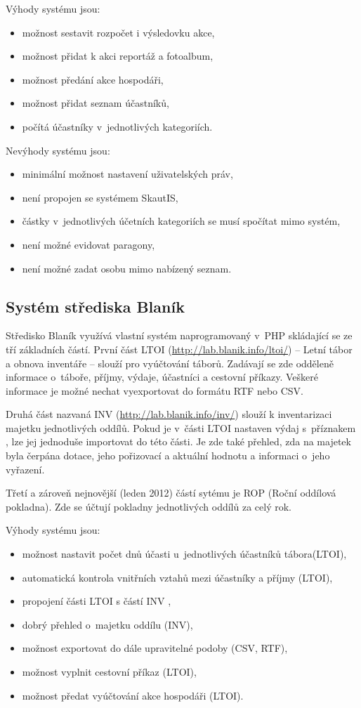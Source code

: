 \documentclass[thesis=B,czech]{FITthesis}[2012/04/27]
\begin{document}
Výhody systému jsou:
\begin{itemize}
	\item možnost sestavit rozpočet i výsledovku akce,
	\item možnost přidat k akci reportáž a fotoalbum,
	\item možnost předání akce hospodáři,
	\item možnost přidat seznam účastníků,
	\item počítá účastníky v~jednotlivých kategoriích.
\end{itemize}

Nevýhody systému jsou:
\begin{itemize}
	\item minimální možnost nastavení uživatelských práv,
	\item není propojen se systémem SkautIS,
	\item částky v~jednotlivých účetních kategoriích se musí spočítat mimo systém,
	\item není možné evidovat paragony,
	\item není možné zadat osobu mimo nabízený seznam.
\end{itemize}

\subsection{Systém střediska Blaník}
Středisko Blaník využívá vlastní systém naprogramovaný v~PHP skládající se ze tří základních částí. První část LTOI (\url{http://lab.blanik.info/ltoi/}) -- Letní tábor a obnova inventáře -- slouží pro vyúčtování táborů. Zadávají se zde odděleně informace o~táboře, příjmy, výdaje, účastníci a cestovní příkazy. Veškeré informace je možné nechat vyexportovat do formátu RTF nebo CSV.

Druhá část nazvaná INV (\url{http://lab.blanik.info/inv/}) slouží k inventarizaci majetku jednotlivých oddílů. Pokud je v~části LTOI nastaven výdaj s~příznakem , lze jej jednoduše importovat do této části. Je zde také přehled, zda na majetek byla čerpána dotace, jeho pořizovací a aktuální hodnotu a informaci o~jeho vyřazení.

Třetí a zároveň nejnovější (leden 2012) částí sytému je ROP (Roční od\-dílová pokladna). Zde se účtují pokladny jednotlivých oddílů za celý rok.

Výhody systému jsou:
\begin{itemize}
	\item možnost nastavit počet dnů účasti u~jednotlivých účastníků tábora\-(LTOI),
	\item automatická kontrola vnitřních vztahů mezi účastníky a příjmy (LTOI),
	\item propojení části LTOI s částí INV ,
	\item dobrý přehled o~majetku oddílu (INV),
	\item možnost exportovat do dále upravitelné podoby (CSV, RTF),
	\item možnost vyplnit cestovní příkaz (LTOI),
	\item možnost předat vyúčtování akce hospodáři (LTOI).
\end{itemize}
\end{document}
